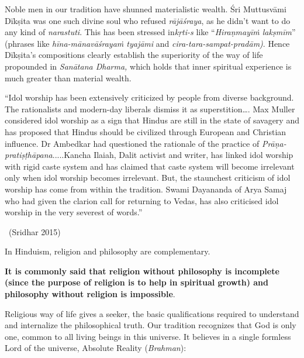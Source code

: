 Noble men in our tradition have shunned materialistic wealth. Śri Muttusvāmi Dīkṣita was one such divine soul who refused \textit{rājāśraya}, as he didn’t want to do any kind of \textit{narastuti}. This has been stressed in\break \textit{kṛti-s} like “\textit{Hiraṇmayīṁ lakṣmīm}” (phrases like \textit{hīna-mānavāśrayaṁ tyajāmi} and \textit{cira-tara-sampat-pradām)}. Hence Dīkṣita’s compositions clearly establish the superiority of the way of life propounded in \textit{Sanātana Dharma,} which holds that inner spiritual experience is much greater than material wealth.

\begin{myquote}
“Idol worship has been extensively criticized by people from diverse background. The rationalists and modern-day liberals dismiss it as superstition…. Max Muller considered idol worship as a sign that Hindus are still in the state of savagery and has proposed that Hindus should be civilized through European and Christian influence. Dr Ambedkar had questioned the rationale of the practice of \textit{Prāṇa-pratiṣṭhāpana}.....Kancha Ilaiah, Dalit activist and writer, has linked idol worship with rigid caste system and has claimed that caste system will become irrelevant only when idol worship becomes irrelevant. But, the staunchest criticism of idol worship has come from within the tradition. Swami Dayananda of Arya Samaj who had given the clarion call for returning to Vedas, has also criticised idol worship in the very severest of words.” 

~\hfill (Sridhar 2015)
\end{myquote}

In Hinduism, religion and philosophy are complementary.

\textbf{It is commonly said that religion without philosophy is incomplete (since the purpose of religion is to help in spiritual growth) and philosophy without religion is impossible}.

Religious way of life gives a seeker, the basic qualifications required to understand and internalize the philosophical truth. Our tradition recognizes that God is only one, common to all living beings in this universe. It believes in a single formless Lord of the universe, Absolute Reality (\textit{Brahman}):

